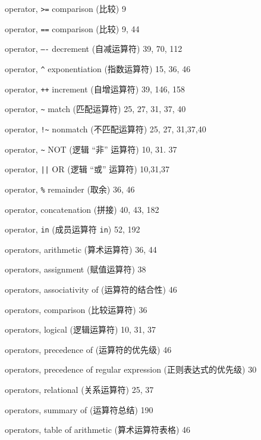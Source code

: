 \begin{multicols}{3}
\hangindent=3pc  operator, \verb'>=' comparison (比较) 9

\hangindent=3pc  operator, \verb'==' comparison (比较) 9, 44

\hangindent=3pc  operator, \verb'—-' decrement (自减运算符)
39, 70, 112

\hangindent=3pc  operator, \verb'^' exponentiation (指数运算符)
15, 36, 46

\hangindent=3pc  operator, \verb'++' increment (自增运算符)
39, 146, 158

\hangindent=3pc  operator, \verb'~' match (匹配运算符) 25, 27, 31, 37, 40

\hangindent=3pc  operator, \verb'!~' nonmatch (不匹配运算符)
25, 27, 31,37,40

\hangindent=3pc  operator, \verb'~' NOT (逻辑 ``非'' 运算符)
10, 31. 37

\hangindent=3pc  operator, \verb'||' OR (逻辑 ``或'' 运算符)
10,31,37

\hangindent=3pc  operator, \verb'%' remainder (取余) 36, 46

\hangindent=3pc  operator, concatenation (拼接) 40, 43,  182

\hangindent=3pc  operator, \verb'in' (成员运算符 \verb'in') 52, 192

\hangindent=3pc  operators, arithmetic (算术运算符) 36, 44

\hangindent=3pc  operators, assignment (赋值运算符) 38

\hangindent=3pc  operators, associativity of (运算符的结合性) 46

\hangindent=3pc  operators, comparison (比较运算符) 36

\hangindent=3pc  operators, logical (逻辑运算符) 10, 31, 37

\hangindent=3pc  operators, precedence of (运算符的优先级) 46

\hangindent=3pc  operators, precedence of regular expression
(正则表达式的优先级) 30

\hangindent=3pc  operators, relational (关系运算符) 25, 37

\hangindent=3pc  operators, summary of (运算符总结) 190

\hangindent=3pc  operators, table of arithmetic (算术运算符表格) 46


\end{multicols}
